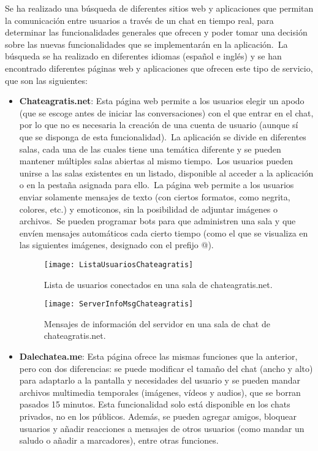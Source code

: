 
Se ha realizado una búsqueda de diferentes sitios web y aplicaciones que permitan la comunicación entre usuarios a
través de un chat en tiempo real, para determinar las funcionalidades generales que ofrecen y poder tomar una decisión
sobre las nuevas funcionalidades que se implementarán en la aplicación.\ La búsqueda se ha realizado en diferentes
idiomas (español e inglés) y se han encontrado diferentes páginas web y aplicaciones que ofrecen este tipo de
servicio, que son las siguientes:

\begin{itemize}
	\item \textbf{Chateagratis.net}: Esta página web permite a los usuarios elegir un apodo (que se escoge antes de
	iniciar las conversaciones) con el que entrar en el chat, por lo que no es necesaria la creación de una cuenta de
	usuario (aunque sí que se disponga de esta funcionalidad).\ La aplicación se divide en diferentes salas, cada una
	de las cuales tiene una temática diferente y se pueden mantener múltiples salas abiertas al mismo tiempo.\ Los
	usuarios pueden unirse a las salas existentes en un listado, disponible al acceder a la aplicación o en la pestaña
	asignada para ello.\ La página web permite a los usuarios enviar solamente mensajes de texto (con ciertos
	formatos, como negrita, colores, etc.) y emoticonos, sin la posibilidad de adjuntar imágenes o archivos.\ Se pueden
	programar bots para que administren una sala y que envíen mensajes automáticos cada cierto tiempo (como el que
	se visualiza en las siguientes imágenes, designado con el prefijo @).

	\begin{figure}[H]
		\centering
		\texttt{[image: ListaUsuariosChateagratis]}
		\caption{Lista de usuarios conectados en una sala de chateagratis.net.}
		\label{fig:ListaUsuariosChateagratis}
	\end{figure}

	\begin{figure}[H]
		\centering
		\texttt{[image: ServerInfoMsgChateagratis]}
		\caption{Mensajes de información del servidor en una sala de chat de chateagratis.net.}
		\label{fig:ServerInfoMsgChateagratis}
	\end{figure}

	\item \textbf{Dalechatea.me}: Esta página ofrece las mismas funciones que la anterior, pero con dos diferencias: se
	puede modificar el tamaño del chat (ancho y alto) para adaptarlo a la pantalla y necesidades del usuario y se
	pueden mandar archivos multimedia temporales (imágenes, vídeos y audios), que se borran pasados 15 minutos.
	Esta funcionalidad solo está disponible en los chats privados, no en los públicos.
	Además, se pueden agregar amigos, bloquear usuarios y añadir reacciones a mensajes de otros usuarios (como mandar
	un saludo o añadir a marcadores), entre otras funciones.


\end{itemize}
